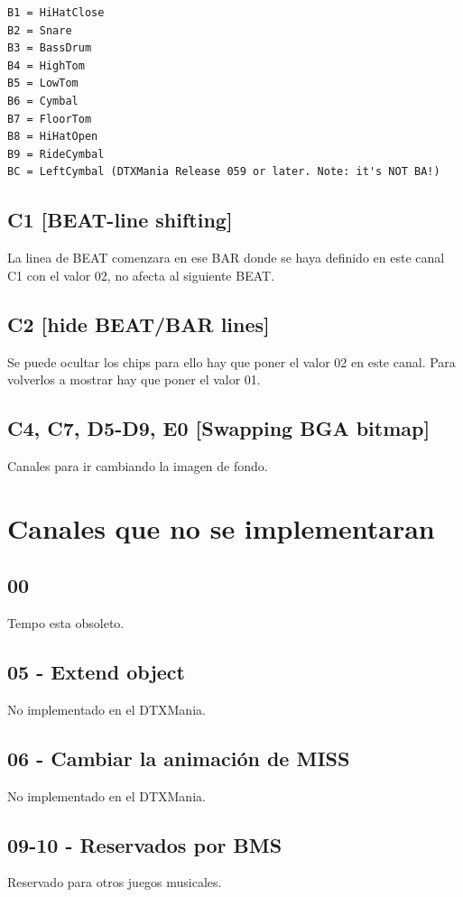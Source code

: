 \documentclass[a4paper,11pt,oneside]{book}
\begin{document}
\begin{Verbatim}[frame=single]
B1 = HiHatClose
B2 = Snare
B3 = BassDrum
B4 = HighTom
B5 = LowTom
B6 = Cymbal
B7 = FloorTom
B8 = HiHatOpen
B9 = RideCymbal
BC = LeftCymbal (DTXMania Release 059 or later. Note: it's NOT BA!)
\end{Verbatim}

\subsection{C1 [BEAT-line shifting]}
La linea de BEAT comenzara en ese BAR donde se haya definido en este canal C1 con el valor 02, no afecta al siguiente BEAT.

\subsection{C2 [hide BEAT/BAR lines]}
Se puede ocultar los chips para ello hay que poner el valor 02 en este canal. Para volverlos a mostrar hay que poner el valor 01.

\subsection{C4, C7, D5-D9, E0 [Swapping BGA bitmap] }
Canales para ir cambiando la imagen de fondo.


\section{Canales que no se implementaran}

\subsection{00}
Tempo esta obsoleto.

\subsection{05 - Extend object}
No implementado en el DTXMania.

\subsection{06 - Cambiar la animación de MISS}
No implementado en el DTXMania.

\subsection{09-10 - Reservados por BMS}
Reservado para otros juegos musicales.
\end{document}
